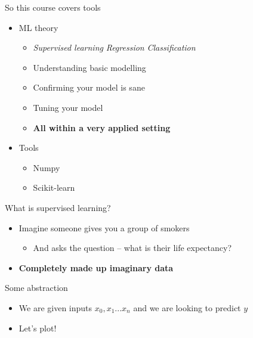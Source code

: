 \documentclass[obeyspaces,aspectratio=43]{beamer}
\providecommand{\tightlist}{%
  \setlength{\itemsep}{0pt}\setlength{\parskip}{0pt}}
\begin{document}
\begin{frame}{So this course covers tools}

\begin{itemize}
\tightlist
\item
  ML theory

  \begin{itemize}
  \tightlist
  \item
    \emph{Supervised learning} \emph{Regression} \emph{Classification}
  \item
    Understanding basic modelling
  \item
    Confirming your model is sane
  \item
    Tuning your model
  \item
    \textbf{All within a very applied setting}
  \end{itemize}
\item
  Tools

  \begin{itemize}
  \tightlist
  \item
    Numpy
  \item
    Scikit-learn
  \end{itemize}
\end{itemize}

\end{frame}

\begin{frame}{What is supervised learning?}

\begin{itemize}
\tightlist
\item
  Imagine someone gives you a group of smokers

  \begin{itemize}
  \tightlist
  \item
    And asks the question -- what is their life expectancy?
  \end{itemize}
\item
  \textbf{Completely made up imaginary data}
\end{itemize}

\end{frame}

\begin{frame}{Some abstraction}

\begin{itemize}
\tightlist
\item
  We are given inputs \(x_0, x_1...x_n\) and we are looking to predict
  \(y\)
\item
  Let's plot!
\end{itemize}

\end{frame}
\end{document}
